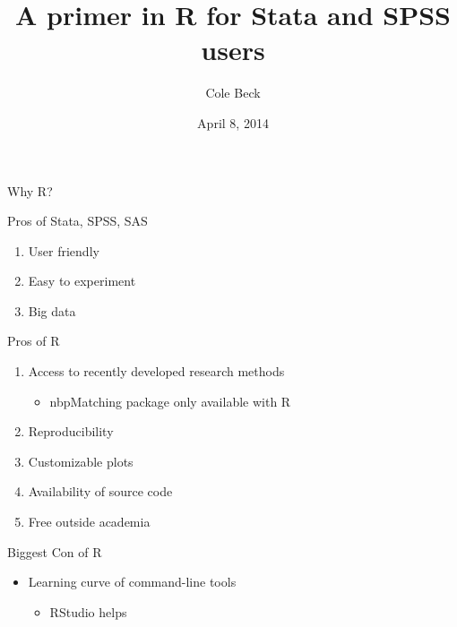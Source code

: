 \documentclass{beamer}
\title[Introduction to R]{A primer in R for Stata and SPSS users}
\author{Cole Beck}
\date{April 8, 2014}
\begin{document}
\begin{frame}
\titlepage
\end{frame}

\begin{frame}{Why R?}

Pros of Stata, SPSS, SAS

\begin{enumerate}
\item User friendly
\item Easy to experiment
\item Big data
\end{enumerate}

Pros of R

\begin{enumerate}
\item Access to recently developed research methods

\begin{itemize}
\item nbpMatching package only available with R
\end{itemize}
\item Reproducibility
\item Customizable plots
\item Availability of source code
\item Free outside academia
\end{enumerate}

Biggest Con of R

\begin{itemize}
\item Learning curve of command-line tools

\begin{itemize}
\item RStudio helps
\end{itemize}
\end{itemize}

\end{frame}
\end{document}
